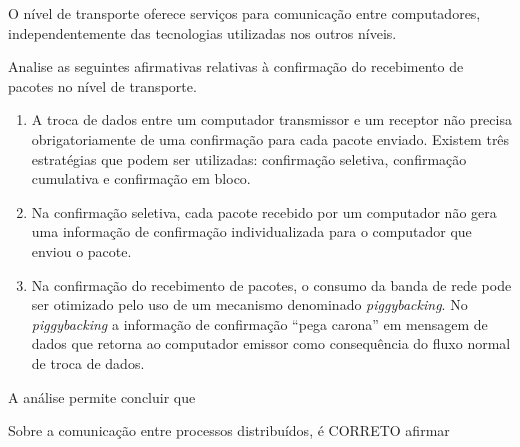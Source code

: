 {
\def\AMCbeginQuestion#1#2{\par\noindent{\bf (POSCOMP 2008 - Questão 08)}}
\begin{question}{} O nível de transporte oferece serviços para comunicação entre computadores, independentemente das tecnologias utilizadas nos outros níveis.

Analise as seguintes afirmativas relativas à confirmação do recebimento de pacotes no nível de transporte.
\begin{enumerate}[label=\Roman*.]
\item A troca de dados entre um computador transmissor e um receptor não precisa obrigatoriamente de uma confirmação para cada pacote enviado. Existem três estratégias que podem ser utilizadas: confirmação seletiva, confirmação cumulativa e confirmação em bloco.
\item Na confirmação seletiva, cada pacote recebido por um computador não gera uma informação de confirmação individualizada para o computador que enviou o pacote.
\item Na confirmação do recebimento de pacotes, o consumo da banda de rede pode ser otimizado pelo uso de um mecanismo denominado \textit{piggybacking}. No \textit{piggybacking} a informação de confirmação ``pega carona'' em mensagem de dados que retorna ao computador emissor como consequência do fluxo normal de troca de dados.
\end{enumerate}
A análise permite concluir que
\begin{choices}
\end{choices}
\end{question}
}
%
{
\def\AMCbeginQuestion#1#2{\par\noindent{\bf (POSCOMP 2008 - Questão 14)}}
\begin{question}{} Sobre a comunicação entre processos distribuídos, é CORRETO afirmar
\begin{choices}
\end{choices}
\end{question}
}
%
